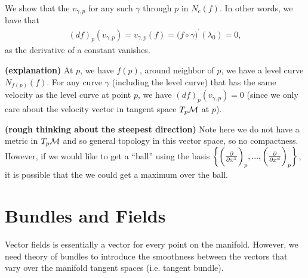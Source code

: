 \documentclass[12pt]{article} %
\newcommand{\bfs}[1]{\textbf{({#1}) }}
\begin{document}
 We show that the  $v_{\gamma,p}$ for any such $\gamma$ through $p$ in $N_c(f)$. In other words, we have that
\begin{align*}
    (df)_p (v_{\gamma,p}) = v_{\gamma,p}(f) = \big(f\circ \gamma)^{\prime}(\lambda_0) =0,
\end{align*} 
as the derivative of a constant vanishes. 
\begin{rema}\bfs{explanation}
At $p$, we have $f(p)$, around neighbor of $p$, we have a level curve $N_{f(p)}(f)$. For any curve $\gamma$ (including the level curve) that has the same velocity as the level curve at point $p$, we have $(df)_p (v_{\gamma,p})=0$ (since we only care about the velocity vector in tangent space $T_p\mathcal{M}$ at $p$).
\end{rema}
\begin{rema}\bfs{rough thinking about the steepest direction}
Note here we do not have a metric in $T_p\mathcal{M}$ and so general topology in this vector space, so no compactness. However, if we would like to get a ``ball'' using the basis $\bigg\{ \bigg(\frac{\partial}{\partial x^1}\bigg)_p, ... , \bigg(\frac{\partial}{\partial x^d}\bigg)_p\bigg\}$, it is possible that the we could get a maximum over the ball.
\end{rema}
\section{Bundles and Fields}
Vector fields  is essentially a vector for every point on the manifold. However, we need theory of bundles to introduce the smoothness between the vectors that vary over the manifold tangent spaces (i.e. tangent bundle).
\end{document}
